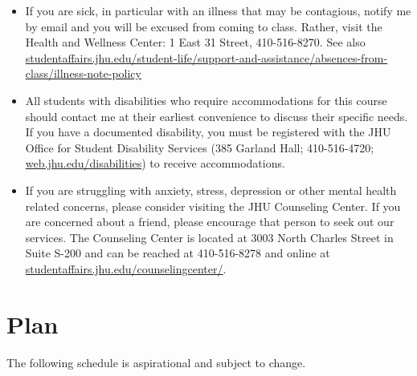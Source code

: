\documentclass{amsart}
\theoremstyle{definition}
\theoremstyle{remark}
\numberwithin{equation}{section}
\begin{document}
\begin{itemize}
\item  If you are sick, in particular with an illness that may be contagious, notify me by email and you will be excused from coming to class. Rather, visit the Health and Wellness Center: 1 East 31 Street, 410-516-8270. See also \href{http://studentaffairs.jhu.edu/student-life/support-and-assistance/absences-from-class/illness-note-policy/}{studentaffairs.jhu.edu/student-life/support-and-assistance/absences-from-class/illness-note-policy}

\item All students with disabilities who require accommodations for this course should contact me at their earliest convenience to discuss their specific needs. If you have a documented disability, you must be registered with the JHU Office for Student Disability Services (385 Garland Hall; 410-516-4720; \href{http://web.jhu.edu/disabilities/}{web.jhu.edu/disabilities}) to receive accommodations.

\item If you are struggling with anxiety, stress, depression or other mental health related concerns, please consider visiting the JHU Counseling Center. If you are concerned about a friend, please encourage that person to seek out our services. The Counseling Center is located at 3003 North Charles Street in Suite S-200 and can be reached at 410-516-8278 and online at  \href{http://studentaffairs.jhu.edu/counselingcenter/}{studentaffairs.jhu.edu/counselingcenter/}.
\end{itemize}

\section*{Plan}

The following schedule is aspirational and subject to change.\\
\end{document}
